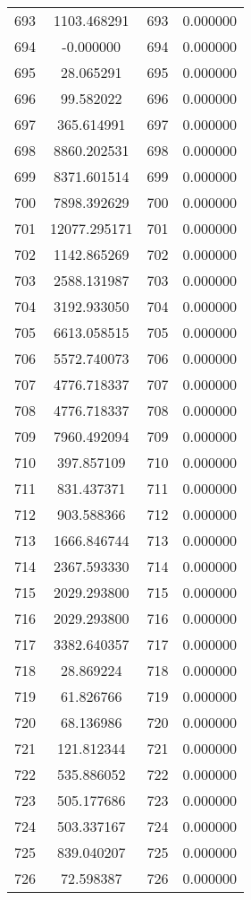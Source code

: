 \documentclass[12pt]{article}
\begin{document}
\begin{longtable}{@{}cccc@{}}
693 & 1103.468291 & 693 & 0.000000 \\
694 & -0.000000 & 694 & 0.000000 \\
695 & 28.065291 & 695 & 0.000000 \\
696 & 99.582022 & 696 & 0.000000 \\
697 & 365.614991 & 697 & 0.000000 \\
698 & 8860.202531 & 698 & 0.000000 \\
699 & 8371.601514 & 699 & 0.000000 \\
700 & 7898.392629 & 700 & 0.000000 \\
701 & 12077.295171 & 701 & 0.000000 \\
702 & 1142.865269 & 702 & 0.000000 \\
703 & 2588.131987 & 703 & 0.000000 \\
704 & 3192.933050 & 704 & 0.000000 \\
705 & 6613.058515 & 705 & 0.000000 \\
706 & 5572.740073 & 706 & 0.000000 \\
707 & 4776.718337 & 707 & 0.000000 \\
708 & 4776.718337 & 708 & 0.000000 \\
709 & 7960.492094 & 709 & 0.000000 \\
710 & 397.857109 & 710 & 0.000000 \\
711 & 831.437371 & 711 & 0.000000 \\
712 & 903.588366 & 712 & 0.000000 \\
713 & 1666.846744 & 713 & 0.000000 \\
714 & 2367.593330 & 714 & 0.000000 \\
715 & 2029.293800 & 715 & 0.000000 \\
716 & 2029.293800 & 716 & 0.000000 \\
717 & 3382.640357 & 717 & 0.000000 \\
718 & 28.869224 & 718 & 0.000000 \\
719 & 61.826766 & 719 & 0.000000 \\
720 & 68.136986 & 720 & 0.000000 \\
721 & 121.812344 & 721 & 0.000000 \\
722 & 535.886052 & 722 & 0.000000 \\
723 & 505.177686 & 723 & 0.000000 \\
724 & 503.337167 & 724 & 0.000000 \\
725 & 839.040207 & 725 & 0.000000 \\
726 & 72.598387 & 726 & 0.000000 \\

\end{longtable}
\end{document}
